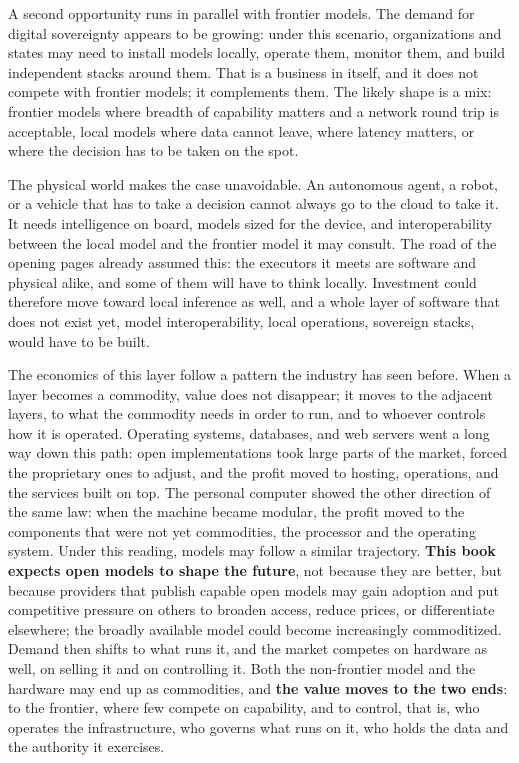 \documentclass[10pt,oneside,openany]{book}
\begin{document}
A second opportunity runs in parallel with frontier models. The demand for digital sovereignty appears to be growing: under this scenario, organizations and states may need to install models locally, operate them, monitor them, and build independent stacks around them. That is a business in itself, and it does not compete with frontier models; it complements them. The likely shape is a mix: frontier models where breadth of capability matters and a network round trip is acceptable, local models where data cannot leave, where latency matters, or where the decision has to be taken on the spot.

The physical world makes the case unavoidable. An autonomous agent, a robot, or a vehicle that has to take a decision cannot always go to the cloud to take it. It needs intelligence on board, models sized for the device, and interoperability between the local model and the frontier model it may consult. The road of the opening pages already assumed this: the executors it meets are software and physical alike, and some of them will have to think locally. Investment could therefore move toward local inference as well, and a whole layer of software that does not exist yet, model interoperability, local operations, sovereign stacks, would have to be built.

The economics of this layer follow a pattern the industry has seen before. When a layer becomes a commodity, value does not disappear; it moves to the adjacent layers, to what the commodity needs in order to run, and to whoever controls how it is operated. Operating systems, databases, and web servers went a long way down this path: open implementations took large parts of the market, forced the proprietary ones to adjust, and the profit moved to hosting, operations, and the services built on top. The personal computer showed the other direction of the same law: when the machine became modular, the profit moved to the components that were not yet commodities, the processor and the operating system. Under this reading, models may follow a similar trajectory. \textbf{This book expects open models to shape the future}, not because they are better, but because providers that publish capable open models may gain adoption and put competitive pressure on others to broaden access, reduce prices, or differentiate elsewhere; the broadly available model could become increasingly commoditized. Demand then shifts to what runs it, and the market competes on hardware as well, on selling it and on controlling it. Both the non-frontier model and the hardware may end up as commodities, and \textbf{the value moves to the two ends}: to the frontier, where few compete on capability, and to control, that is, who operates the infrastructure, who governs what runs on it, who holds the data and the authority it exercises.
\end{document}
